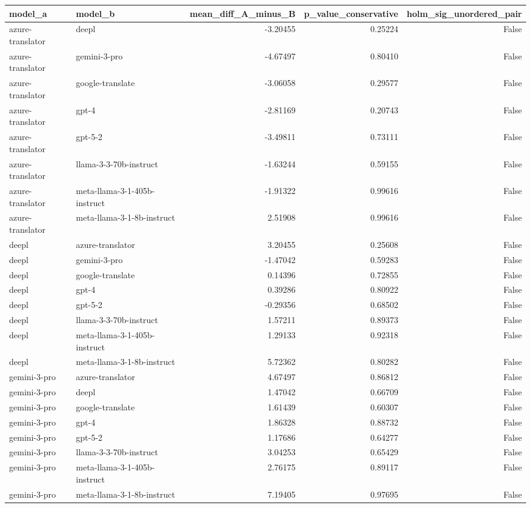 \begin{tabular}{llrrr}
\toprule
model\_a & model\_b & mean\_diff\_A\_minus\_B & p\_value\_conservative & holm\_sig\_unordered\_pair \\
\midrule
azure-translator & deepl & -3.20455 & 0.25224 & False \\
azure-translator & gemini-3-pro & -4.67497 & 0.80410 & False \\
azure-translator & google-translate & -3.06058 & 0.29577 & False \\
azure-translator & gpt-4 & -2.81169 & 0.20743 & False \\
azure-translator & gpt-5-2 & -3.49811 & 0.73111 & False \\
azure-translator & llama-3-3-70b-instruct & -1.63244 & 0.59155 & False \\
azure-translator & meta-llama-3-1-405b-instruct & -1.91322 & 0.99616 & False \\
azure-translator & meta-llama-3-1-8b-instruct & 2.51908 & 0.99616 & False \\
deepl & azure-translator & 3.20455 & 0.25608 & False \\
deepl & gemini-3-pro & -1.47042 & 0.59283 & False \\
deepl & google-translate & 0.14396 & 0.72855 & False \\
deepl & gpt-4 & 0.39286 & 0.80922 & False \\
deepl & gpt-5-2 & -0.29356 & 0.68502 & False \\
deepl & llama-3-3-70b-instruct & 1.57211 & 0.89373 & False \\
deepl & meta-llama-3-1-405b-instruct & 1.29133 & 0.92318 & False \\
deepl & meta-llama-3-1-8b-instruct & 5.72362 & 0.80282 & False \\
gemini-3-pro & azure-translator & 4.67497 & 0.86812 & False \\
gemini-3-pro & deepl & 1.47042 & 0.66709 & False \\
gemini-3-pro & google-translate & 1.61439 & 0.60307 & False \\
gemini-3-pro & gpt-4 & 1.86328 & 0.88732 & False \\
gemini-3-pro & gpt-5-2 & 1.17686 & 0.64277 & False \\
gemini-3-pro & llama-3-3-70b-instruct & 3.04253 & 0.65429 & False \\
gemini-3-pro & meta-llama-3-1-405b-instruct & 2.76175 & 0.89117 & False \\
gemini-3-pro & meta-llama-3-1-8b-instruct & 7.19405 & 0.97695 & False \\

\end{tabular}
